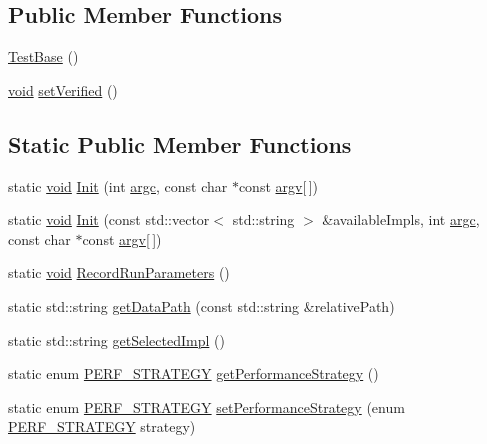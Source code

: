 \subsection*{Public Member Functions}
\begin{DoxyCompactItemize}
\item 
\hyperlink{classperf_1_1TestBase_abfbfbb6d566e4c5a2915ba954a1b15aa}{Test\-Base} ()
\item 
\hyperlink{legacy_8hpp_a8bb47f092d473522721002c86c13b94e}{void} \hyperlink{classperf_1_1TestBase_aaf20fcb26864620893d0009ae958a4e8}{set\-Verified} ()
\end{DoxyCompactItemize}
\subsection*{Static Public Member Functions}
\begin{DoxyCompactItemize}
\item 
static \hyperlink{legacy_8hpp_a8bb47f092d473522721002c86c13b94e}{void} \hyperlink{classperf_1_1TestBase_ad9b11a9d2427b3ac8e01bc66086b8a0f}{Init} (int \hyperlink{highgui__c_8h_a4ee2a7de047a0a236fe118a35e8f76a4}{argc}, const char $\ast$const \hyperlink{highgui__c_8h_a1b5d2a82062528707ab3855772528912}{argv}\mbox{[}$\,$\mbox{]})
\item 
static \hyperlink{legacy_8hpp_a8bb47f092d473522721002c86c13b94e}{void} \hyperlink{classperf_1_1TestBase_ab20aae40b12109b476bc9e18f15e2bfd}{Init} (const std\-::vector$<$ std\-::string $>$ \&available\-Impls, int \hyperlink{highgui__c_8h_a4ee2a7de047a0a236fe118a35e8f76a4}{argc}, const char $\ast$const \hyperlink{highgui__c_8h_a1b5d2a82062528707ab3855772528912}{argv}\mbox{[}$\,$\mbox{]})
\item 
static \hyperlink{legacy_8hpp_a8bb47f092d473522721002c86c13b94e}{void} \hyperlink{classperf_1_1TestBase_ac1d7dfef0343b4f6b6318199796a3b57}{Record\-Run\-Parameters} ()
\item 
static std\-::string \hyperlink{classperf_1_1TestBase_ab687157320d53edf4067caca495d27c6}{get\-Data\-Path} (const std\-::string \&relative\-Path)
\item 
static std\-::string \hyperlink{classperf_1_1TestBase_a4d5f71f58b3fcc423a583c44185d0ad4}{get\-Selected\-Impl} ()
\item 
static enum \hyperlink{namespaceperf_ae0c38b71955bcc6424ad4de8b5284d57}{P\-E\-R\-F\-\_\-\-S\-T\-R\-A\-T\-E\-G\-Y} \hyperlink{classperf_1_1TestBase_a0f428c919d53d8a7a62082e0b969e7a8}{get\-Performance\-Strategy} ()
\item 
static enum \hyperlink{namespaceperf_ae0c38b71955bcc6424ad4de8b5284d57}{P\-E\-R\-F\-\_\-\-S\-T\-R\-A\-T\-E\-G\-Y} \hyperlink{classperf_1_1TestBase_aa7fed2540f5de0dd19f79d41da134167}{set\-Performance\-Strategy} (enum \hyperlink{namespaceperf_ae0c38b71955bcc6424ad4de8b5284d57}{P\-E\-R\-F\-\_\-\-S\-T\-R\-A\-T\-E\-G\-Y} strategy)
\end{DoxyCompactItemize}
